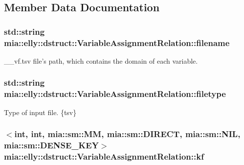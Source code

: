\subsection{Member Data Documentation}
\hypertarget{classmia_1_1elly_1_1dstruct_1_1_variable_assignment_relation_aa48ef4351b3b43eaa3323cb20abb3531}{
\subsubsection[{filename}]{\setlength{\rightskip}{0pt plus 5cm}std\-::string mia\-::elly\-::dstruct\-::\-Variable\-Assignment\-Relation\-::filename}}\label{classmia_1_1elly_1_1dstruct_1_1_variable_assignment_relation_aa48ef4351b3b43eaa3323cb20abb3531}
\-\_\-\-\_\-vf.\-tsv file's path, which contains the domain of each variable. \hypertarget{classmia_1_1elly_1_1dstruct_1_1_variable_assignment_relation_a52e11bd663360277cfc7c7be61d79990}{
\subsubsection[{filetype}]{\setlength{\rightskip}{0pt plus 5cm}std\-::string mia\-::elly\-::dstruct\-::\-Variable\-Assignment\-Relation\-::filetype}}\label{classmia_1_1elly_1_1dstruct_1_1_variable_assignment_relation_a52e11bd663360277cfc7c7be61d79990}
Type of input file. \{tsv\} \hypertarget{classmia_1_1elly_1_1dstruct_1_1_variable_assignment_relation_a1af337a9c0dcbd5fd8413c45df023017}{
\subsubsection[{kf}]{$<$int, int, mia\-::sm\-::\-M\-M, mia\-::sm\-::\-D\-I\-R\-E\-C\-T, mia\-::sm\-::\-N\-I\-L, mia\-::sm\-::\-D\-E\-N\-S\-E\-\_\-\-K\-E\-Y$>$ mia\-::elly\-::dstruct\-::\-Variable\-Assignment\-Relation\-::kf}}\label{classmia_1_1elly_1_1dstruct_1_1_variable_assignment_relation_a1af337a9c0dcbd5fd8413c45df023017}
